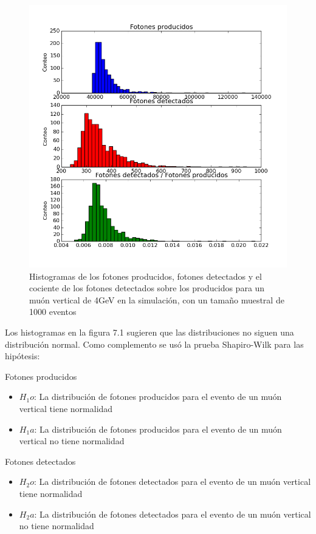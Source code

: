 \documentclass{book}
\begin{document}
\begin{figure}[h] %
\begin{center}
 \includegraphics[width=0.8\linewidth]{FotonesMuonVerticalG4.png}
\caption{Histogramas de los fotones producidos, fotones detectados y el cociente de los fotones detectados sobre los producidos para un mu\'on vertical de 4GeV en la simulaci\'on, con un tama\~no muestral de 1000 eventos}
\end{center}
\end{figure}

Los histogramas en la figura 7.1 sugieren que las distribuciones no siguen una distribuci\'on normal. Como complemento se us\'o la prueba Shapiro-Wilk para las hip\'otesis:

Fotones producidos
\begin{itemize}
\item $H_1o$: La distribuci\'on de fotones producidos para el evento de un mu\'on vertical tiene normalidad
\item $H_1a$: La distribuci\'on de fotones producidos para el evento de un mu\'on vertical no tiene normalidad
\end{itemize}

Fotones detectados
\begin{itemize}
\item $H_2o$: La distribuci\'on de fotones detectados para el evento de un mu\'on vertical tiene normalidad
\item $H_2a$: La distribuci\'on de fotones detectados para el evento de un mu\'on vertical no tiene normalidad
\end{itemize}
\end{document}
